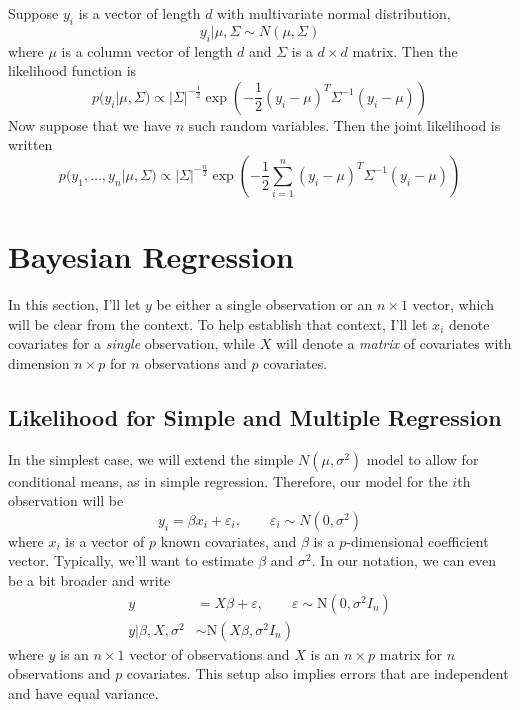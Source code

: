 \documentclass[a4paper,12pt]{scrartcl}
\begin{document}
Suppose $y_i$ is a vector of length $d$ with multivariate normal
distribution, 
   \[ y_i | \mu, \Sigma \sim N(\mu, \Sigma) \]
where $\mu$ is a column vector of length $d$ and $\Sigma$ is a
$d\times d$ matrix.  Then the likelihood function is 
   \[ p(y_i |\mu,\Sigma) \propto |\Sigma|^{-\frac{1}{2}} 
   \exp \left( -\frac{1}{2}(y_i-\mu)^T \Sigma^{-1} (y_i-\mu)\right)\]
Now suppose that we have $n$ such random variables. Then the joint
likelihood is written
   \[ p(y_1, \ldots, y_n | \mu, \Sigma) \propto 
      |\Sigma|^{-\frac{n}{2}}
      \exp \left( -\frac{1}{2} \sum_{i=1}^n
      (y_i-\mu)^T \Sigma^{-1} (y_i-\mu)\right)\]






\newpage
\section{Bayesian Regression}

In this section, I'll let $y$ be either a single observation or an
$n\times1$ vector, which will be clear from the context. To help 
establish that context, I'll let $x_i$ denote covariates for a 
\emph{single} observation, while $X$ will denote a \emph{matrix}
of covariates with dimension $n\times p$ for $n$ observations and
$p$ covariates.


\subsection{Likelihood for Simple and Multiple Regression}

In the simplest case, we will extend the simple $N(\mu,\sigma^2)$ model
to allow for conditional means, as in simple regression. 
Therefore, our model for the $i$th observation will be
\[ y_i = \beta x_i + \varepsilon_i, \qquad 
   \varepsilon_i \sim N(0,\sigma^2) \]
where $x_i$ is a vector of $p$ known covariates, and $\beta$ is a 
$p$-dimensional coefficient vector. Typically, we'll want to estimate
$\beta$ and $\sigma^2$. In our notation, we can even be a bit broader
and write
\begin{align*}
    y &= X \beta  + \varepsilon, \qquad  \varepsilon \sim 
      \text{N}(0, \sigma^2 I_n) \\  
      y| \beta, X, \sigma^2 &\sim \text{N}(X\beta, \sigma^2 I_n) 
\end{align*}
where $y$ is an $n\times1$ vector of observations and
$X$ is an $n\times p$ matrix for $n$ observations and $p$
covariates. This setup also implies errors that are 
independent and have equal variance. 
\end{document}
